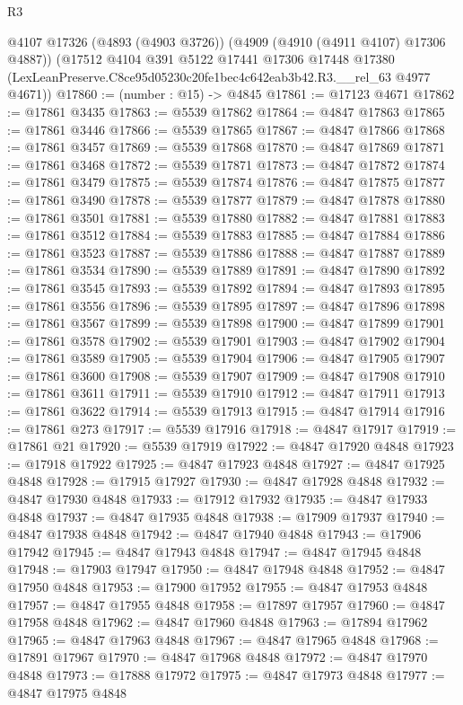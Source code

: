 \begin{lexlean}{R3}
\begin{coremodule}
    @4107
    @17326
    (@4893 (@4903 @3726))
    (@4909 (@4910 (@4911 @4107) @17306 @4887))
    (@17512
      @4104
      @391
      @5122
      @17441
      @17306
      @17448
      @17380
      (LexLeanPreserve.C8ce95d05230c20fe1bec4c642eab3b42.R3.__rel_63 @4977 @4671))
@17860 := (number : @15) -> @4845
@17861 := @17123 @4671
@17862 := @17861 @3435
@17863 := @5539 @17862
@17864 := @4847 @17863
@17865 := @17861 @3446
@17866 := @5539 @17865
@17867 := @4847 @17866
@17868 := @17861 @3457
@17869 := @5539 @17868
@17870 := @4847 @17869
@17871 := @17861 @3468
@17872 := @5539 @17871
@17873 := @4847 @17872
@17874 := @17861 @3479
@17875 := @5539 @17874
@17876 := @4847 @17875
@17877 := @17861 @3490
@17878 := @5539 @17877
@17879 := @4847 @17878
@17880 := @17861 @3501
@17881 := @5539 @17880
@17882 := @4847 @17881
@17883 := @17861 @3512
@17884 := @5539 @17883
@17885 := @4847 @17884
@17886 := @17861 @3523
@17887 := @5539 @17886
@17888 := @4847 @17887
@17889 := @17861 @3534
@17890 := @5539 @17889
@17891 := @4847 @17890
@17892 := @17861 @3545
@17893 := @5539 @17892
@17894 := @4847 @17893
@17895 := @17861 @3556
@17896 := @5539 @17895
@17897 := @4847 @17896
@17898 := @17861 @3567
@17899 := @5539 @17898
@17900 := @4847 @17899
@17901 := @17861 @3578
@17902 := @5539 @17901
@17903 := @4847 @17902
@17904 := @17861 @3589
@17905 := @5539 @17904
@17906 := @4847 @17905
@17907 := @17861 @3600
@17908 := @5539 @17907
@17909 := @4847 @17908
@17910 := @17861 @3611
@17911 := @5539 @17910
@17912 := @4847 @17911
@17913 := @17861 @3622
@17914 := @5539 @17913
@17915 := @4847 @17914
@17916 := @17861 @273
@17917 := @5539 @17916
@17918 := @4847 @17917
@17919 := @17861 @21
@17920 := @5539 @17919
@17922 := @4847 @17920 @4848
@17923 := @17918 @17922
@17925 := @4847 @17923 @4848
@17927 := @4847 @17925 @4848
@17928 := @17915 @17927
@17930 := @4847 @17928 @4848
@17932 := @4847 @17930 @4848
@17933 := @17912 @17932
@17935 := @4847 @17933 @4848
@17937 := @4847 @17935 @4848
@17938 := @17909 @17937
@17940 := @4847 @17938 @4848
@17942 := @4847 @17940 @4848
@17943 := @17906 @17942
@17945 := @4847 @17943 @4848
@17947 := @4847 @17945 @4848
@17948 := @17903 @17947
@17950 := @4847 @17948 @4848
@17952 := @4847 @17950 @4848
@17953 := @17900 @17952
@17955 := @4847 @17953 @4848
@17957 := @4847 @17955 @4848
@17958 := @17897 @17957
@17960 := @4847 @17958 @4848
@17962 := @4847 @17960 @4848
@17963 := @17894 @17962
@17965 := @4847 @17963 @4848
@17967 := @4847 @17965 @4848
@17968 := @17891 @17967
@17970 := @4847 @17968 @4848
@17972 := @4847 @17970 @4848
@17973 := @17888 @17972
@17975 := @4847 @17973 @4848
@17977 := @4847 @17975 @4848

\end{coremodule}
\end{lexlean}
